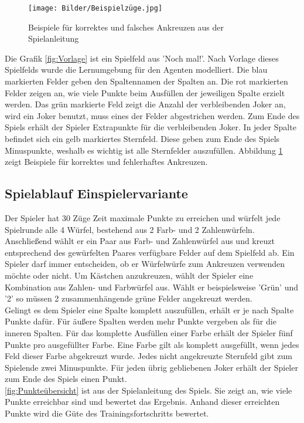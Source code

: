 \begin{figure}[!h]
	\centering
	\texttt{[image: Bilder/Beispielzüge.jpg]}
	\caption{Beispiele für korrektes und falsches Ankreuzen aus der Spielanleitung 
	\cite{schmidt_spiele_gmbh_spielregeln_nodate}}
	\label{fig:Beispiel}
\end{figure}

Die Grafik \ref{fig:Vorlage} ist ein Spielfeld aus 'Noch mal!'. Nach Vorlage dieses Spielfelds wurde die Lernumgebung für den Agenten modelliert. Die blau markierten Felder geben den Spaltennamen der Spalten an. Die rot markierten Felder zeigen an, wie viele Punkte beim Ausfüllen der jeweiligen Spalte erzielt werden. Das grün markierte Feld zeigt die Anzahl der verbleibenden Joker an, wird ein Joker benutzt, muss eines der Felder abgestrichen werden. Zum Ende des Spiels erhält der Spieler Extrapunkte für die verbleibenden Joker. In jeder Spalte befindet sich ein gelb markiertes Sternfeld. Diese geben zum Ende des Spiels Minuspunkte, weshalb es wichtig ist alle Sternfelder auszufüllen. Abbildung \ref{fig:Beispiel} zeigt Beispiele für korrektes und fehlerhaftes Ankreuzen.


\clearpage


\subsection{Spielablauf Einspielervariante}
Der Spieler hat 30 Züge Zeit maximale Punkte zu erreichen und würfelt jede Spielrunde alle 4 Würfel, bestehend aus 2 Farb- und 2 Zahlenwürfeln. Anschließend wählt er ein Paar aus Farb- und Zahlenwürfel aus und kreuzt entsprechend des gewürfelten Paares verfügbare Felder auf dem Spielfeld ab.
Ein Spieler darf immer entscheiden, ob er Würfelwürfe zum Ankreuzen verwenden möchte oder nicht.
Um Kästchen anzukreuzen, wählt der Spieler eine Kombination aus Zahlen- und Farbwürfel aus. Wählt er beispielsweise 'Grün' und '2' so müssen 2 zusammenhängende grüne Felder angekreuzt werden. \\
Gelingt es dem  Spieler eine Spalte komplett auszufüllen, erhält er je nach Spalte Punkte dafür. Für äußere Spalten werden mehr Punkte vergeben als für die inneren Spalten.
Für das komplette Ausfüllen einer Farbe erhält der Spieler fünf Punkte pro ausgefüllter Farbe. Eine Farbe gilt als komplett ausgefüllt, wenn jedes Feld dieser Farbe abgekreuzt wurde.
Jedes nicht angekreuzte Sternfeld gibt zum Spielende zwei Minuspunkte.
Für jeden übrig gebliebenen Joker erhält der Spieler zum Ende des Spiels einen Punkt.\\
\ref{fig:Punkteübersicht} ist aus der Spielanleitung des Spiels. Sie zeigt an, wie viele Punkte erreichbar sind und bewertet das Ergebnis. Anhand dieser erreichten Punkte wird die Güte des Trainingsfortschritts bewertet.

